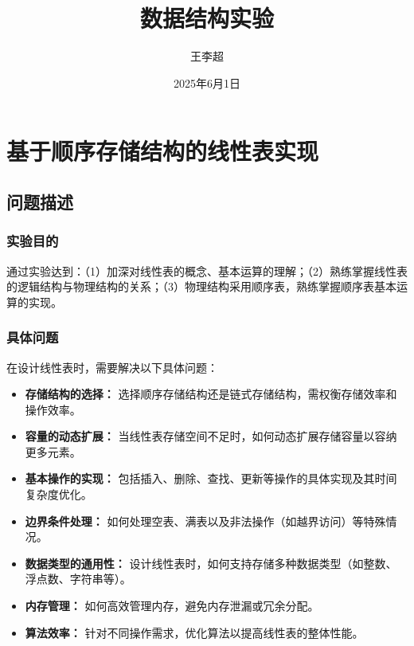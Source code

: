 \documentclass[supercite]{Experimental_Report}
\title{~~~~~~数据结构实验~~~~~~}
\author{王李超}
\date{2025年6月1日}
\theoremstyle{definition}
\begin{document}
\maketitle

\clearpage


\tableofcontents[level=2]

\clearpage


\section{基于顺序存储结构的线性表实现}



\subsection{问题描述}

\subsubsection{实验目的}
通过实验达到：（1）加深对线性表的概念、基本运算的理解；（2）熟练掌握线性表的逻辑结构与物理结构的关系；（3）物理结构采用顺序表，熟练掌握顺序表基本运算的实现。

\subsubsection{具体问题}

在设计线性表时，需要解决以下具体问题：
\begin{itemize}
	\item \textbf{存储结构的选择：} 选择顺序存储结构还是链式存储结构，需权衡存储效率和操作效率。
	\item \textbf{容量的动态扩展：} 当线性表存储空间不足时，如何动态扩展存储容量以容纳更多元素。
	\item \textbf{基本操作的实现：} 包括插入、删除、查找、更新等操作的具体实现及其时间复杂度优化。
	\item \textbf{边界条件处理：} 如何处理空表、满表以及非法操作（如越界访问）等特殊情况。
	\item \textbf{数据类型的通用性：} 设计线性表时，如何支持存储多种数据类型（如整数、浮点数、字符串等）。
	\item \textbf{内存管理：} 如何高效管理内存，避免内存泄漏或冗余分配。
	\item \textbf{算法效率：} 针对不同操作需求，优化算法以提高线性表的整体性能。
\end{itemize}
\end{document}
